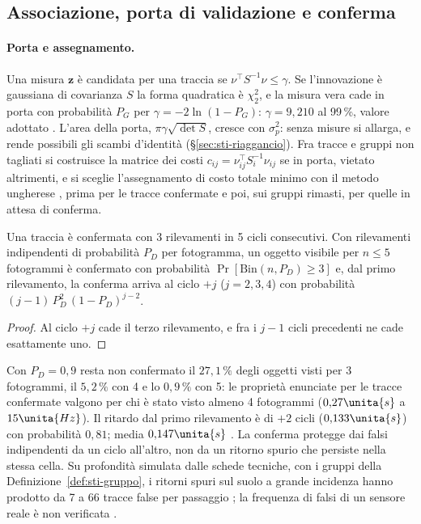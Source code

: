 \subsection{Associazione, porta di validazione e conferma}\label{sec:sti-porta}

\paragraph{Porta e assegnamento.} Una misura $\mathbf z$ è candidata per una traccia se $\nu^{\top}S^{-1}\nu\le\gamma$. Se l'innovazione è gaussiana di covarianza $S$ la forma quadratica è $\chi^2_2$, e la misura vera cade in porta con probabilità $P_G$ per $\gamma=-2\ln(1-P_G)$: $\gamma=9{,}210$ al 99\,\%, valore adottato . L'area della porta, $\pi\gamma\sqrt{\det S}$, cresce con $\sigma_p^2$: senza misure si allarga, e rende possibili gli scambi d'identità (\S\ref{sec:sti-riaggancio}). Fra tracce e gruppi non tagliati si costruisce la matrice dei costi $c_{ij}=\nu_{ij}^{\top}S_i^{-1}\nu_{ij}$ se in porta, vietato altrimenti, e si sceglie l'assegnamento di costo totale minimo con il metodo ungherese \cite{kuhn1955}, prima per le tracce confermate e poi, sui gruppi rimasti, per quelle in attesa di conferma.

\begin{proposizione}[Conferma]\label{prop:sti-conferma}
Una traccia è confermata con 3 rilevamenti in 5 cicli consecutivi. Con rilevamenti indipendenti di probabilità $P_D$ per fotogramma, un oggetto visibile per $n\le5$ fotogrammi è confermato con probabilità $\Pr[\mathrm{Bin}(n,P_D)\ge3]$ e, dal primo rilevamento, la conferma arriva al ciclo $+j$ ($j=2,3,4$) con probabilità $(j-1)\,P_D^2\,(1-P_D)^{j-2}$. 
\end{proposizione}
\begin{proof}
Al ciclo $+j$ cade il terzo rilevamento, e fra i $j-1$ cicli precedenti ne cade esattamente uno.
\end{proof}
Con $P_D=0{,}9$ resta non confermato il $27{,}1\,\%$ degli oggetti visti per 3 fotogrammi, il $5{,}2\,\%$ con 4 e lo $0{,}9\,\%$ con 5: le proprietà enunciate per le tracce confermate valgono per chi è stato visto almeno 4 fotogrammi ($0{,}27\unita{s}$ a $15\unita{Hz}$). Il ritardo dal primo rilevamento è di $+2$ cicli ($0{,}133\unita{s}$) con probabilità $0{,}81$; media $0{,}147\unita{s}$ . La conferma protegge dai falsi indipendenti da un ciclo all'altro, non da un ritorno spurio che persiste nella stessa cella. Su profondità simulata dalle schede tecniche, con i gruppi della Definizione~\ref{def:sti-gruppo}, i ritorni spuri sul suolo a grande incidenza hanno prodotto da 7 a 66 tracce false per passaggio ; la frequenza di falsi di un sensore reale è non verificata .

